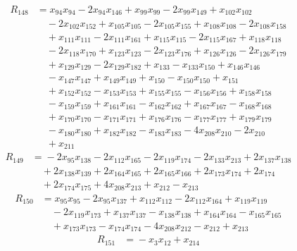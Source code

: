 \begin{align*}
R_{148}&={}x_{94}x_{94} -2x_{94}x_{146} +x_{99}x_{99} -2x_{99}x_{149} +x_{102}x_{102}\\
&\quad{}-2x_{102}x_{152} +x_{105}x_{105} -2x_{105}x_{155} +x_{108}x_{108} -2x_{108}x_{158}\\
&\quad{}+x_{111}x_{111} -2x_{111}x_{161} +x_{115}x_{115} -2x_{115}x_{167} +x_{118}x_{118}\\
&\quad{}-2x_{118}x_{170} +x_{123}x_{123} -2x_{123}x_{176} +x_{126}x_{126} -2x_{126}x_{179}\\
&\quad{}+x_{129}x_{129} -2x_{129}x_{182} +x_{133} -x_{133}x_{150} +x_{146}x_{146}\\
&\quad{}-x_{147}x_{147} +x_{149}x_{149} +x_{150} -x_{150}x_{150} +x_{151}\\
&\quad{}+x_{152}x_{152} -x_{153}x_{153} +x_{155}x_{155} -x_{156}x_{156} +x_{158}x_{158}\\
&\quad{}-x_{159}x_{159} +x_{161}x_{161} -x_{162}x_{162} +x_{167}x_{167} -x_{168}x_{168}\\
&\quad{}+x_{170}x_{170} -x_{171}x_{171} +x_{176}x_{176} -x_{177}x_{177} +x_{179}x_{179}\\
&\quad{}-x_{180}x_{180} +x_{182}x_{182} -x_{183}x_{183} -4x_{208}x_{210} -2x_{210}\\
&\quad{}+x_{211}
\end{align*}
\begin{align*}
R_{149}&={}-2x_{95}x_{138} -2x_{112}x_{165} -2x_{119}x_{174} -2x_{133}x_{213} +2x_{137}x_{138}\\
&\quad{}+2x_{138}x_{139} +2x_{164}x_{165} +2x_{165}x_{166} +2x_{173}x_{174} +2x_{174}\\
&\quad{}+2x_{174}x_{175} +4x_{208}x_{213} +x_{212} -x_{213}
\end{align*}
\begin{align*}
R_{150}&={}x_{95}x_{95} -2x_{95}x_{137} +x_{112}x_{112} -2x_{112}x_{164} +x_{119}x_{119}\\
&\quad{}-2x_{119}x_{173} +x_{137}x_{137} -x_{138}x_{138} +x_{164}x_{164} -x_{165}x_{165}\\
&\quad{}+x_{173}x_{173} -x_{174}x_{174} -4x_{208}x_{212} -x_{212} +x_{213}
\end{align*}
\begin{align*}
R_{151}&={}-x_{3}x_{12} +x_{214}
\end{align*}
\endgroup
